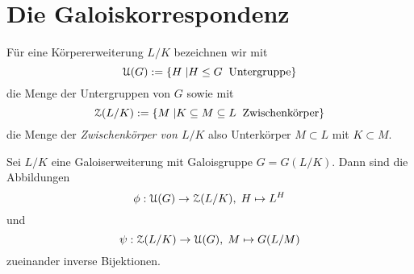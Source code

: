 \documentclass{book}
\begin{document}
\section{Die Galoiskorrespondenz}%
\label{sec:die_galoiskorrespondenz}

Für eine Körpererweiterung $L/K$ bezeichnen wir mit
\[
    \EuScript{U}(G) := \{ H \; | H \le G\; \;\text{Untergruppe}\}
\]
die Menge der Untergruppen von $G$ sowie mit
\[
    \EuScript{Z}(L/K) := \{ M \; | K \subseteq M \subseteq L\; \;\text{Zwischenkörper}\}
\]
die Menge der {\em Zwischenkörper von $L/K$} also Unterkörper $M \subset L$ mit $K \subset M$. 

\begin{thm}[Galoiskorrespondenz]
    \label{thm:hauptsatz}
    Sei $L/K$ eine Galoiserweiterung mit Galoisgruppe $G=G(L/K)$. Dann sind die Abbildungen
    \[
         \phi: \eU(G) \to \eZ(L/K), \; H \mapsto L^H
    \]
    und 
    \[
         \psi: \EuScript{Z}(L/K) \to \EuScript{U}(G), \; M \mapsto G(L/M)
    \]
    zueinander inverse Bijektionen.
\end{thm}
\end{document}
